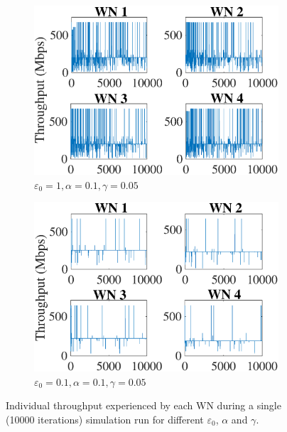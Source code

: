 \documentclass[conference]{IEEEtran}
\begin{document}
\begin{figure}[h!]
\begin{subfigure}[b]{0.225\textwidth}
			\includegraphics[width=\textwidth]{images/e_1_a_01_g_005_ind_tpt}
			\caption{$\varepsilon_0=1, \alpha=0.1, \gamma=0.05$}
			\label{fig:e_1_a_01_g_005_ind_tpt}
		\end{subfigure}
		\begin{subfigure}[b]{0.225\textwidth}
			\includegraphics[width=\textwidth]{images/e_01_a_01_g_005_ind_tpt}
			\caption{$\varepsilon_0=0.1, \alpha=0.1, \gamma=0.05$}
			\label{fig:e_01_a_01_g_005_ind_tpt}
		\end{subfigure}
		\caption{Individual throughput experienced by each WN during a single (10000 iterations) simulation run for different $\varepsilon_0$, $\alpha$ and $\gamma$.}
		\label{fig:ql_params_eval_individual_tpt}
	\end{figure}
	
\end{document}
